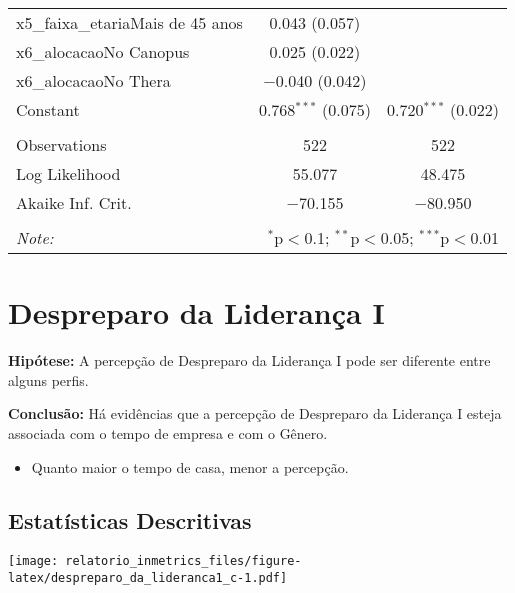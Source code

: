 \documentclass[]{book}
\providecommand{\tightlist}{%
  \setlength{\itemsep}{0pt}\setlength{\parskip}{0pt}}
\begin{document}
\begin{table}[!htbp]
\begin{tabular}{@{\extracolsep{5pt}}lcc}
  x5\_faixa\_etariaMais de 45 anos & 0.043 (0.057) &  \\ 
  x6\_alocacaoNo Canopus & 0.025 (0.022) &  \\ 
  x6\_alocacaoNo Thera & $-$0.040 (0.042) &  \\ 
  Constant & 0.768$^{***}$ (0.075) & 0.720$^{***}$ (0.022) \\ 
 \hline \\[-1.8ex] 
Observations & 522 & 522 \\ 
Log Likelihood & 55.077 & 48.475 \\ 
Akaike Inf. Crit. & $-$70.155 & $-$80.950 \\ 
\hline 
\hline \\[-1.8ex] 
\textit{Note:}  & \multicolumn{2}{r}{$^{*}$p$<$0.1; $^{**}$p$<$0.05; $^{***}$p$<$0.01} \\ 
\end{tabular} 
\end{table}

\hypertarget{despreparo-da-lideranca-i}{%
\section{Despreparo da Liderança I}\label{despreparo-da-lideranca-i}}

\textbf{Hipótese:} A percepção de Despreparo da Liderança I pode ser diferente entre alguns perfis.

\textbf{Conclusão:} Há evidências que a percepção de Despreparo da Liderança I esteja associada com o tempo de empresa e com o Gênero.

\begin{itemize}
\tightlist
\item
  Quanto maior o tempo de casa, menor a percepção.
\end{itemize}

\hypertarget{estatisticas-descritivas-2}{%
\subsection{Estatísticas Descritivas}\label{estatisticas-descritivas-2}}

\texttt{[image: relatorio\_inmetrics\_files/figure-latex/despreparo\_da\_lideranca1\_c-1.pdf]}
\end{document}

